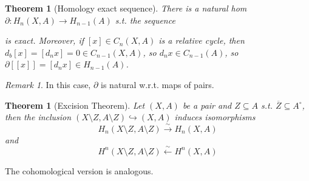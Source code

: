 \documentclass{article}
\theoremstyle{definition}
\theoremstyle{remark}
\newtheorem{rem}{Remark}
\theoremstyle{plain}
\newtheorem{thm}[defn]{Theorem}
\begin{document}
\begin{thm}[Homology exact sequence]
There is a natural hom $\partial:H_n(X,A)\to H_{n-1}(A)$ s.t. the sequence
\begin{center}
\end{center}
is exact. Moreover, if $[x]\in C_n(X,A)$ is a relative cycle, then $d_b[x]=[d_nx]=0\in C_{n-1}(X,A)$, so $d_nx\in C_{n-1}(A)$, so $\partial[[x]]=[d_nx]\in H_{n-1}(A)$.
\end{thm}
\begin{rem}
    In this case, $\partial$ is natural w.r.t. maps of pairs.
\end{rem}
\begin{thm}[Excision Theorem]
Let $(X,A)$ be a pair and $Z\subseteq A$ s.t. $\overline{Z}\subseteq A^\circ$, then the inclusion $(X\setminus Z,A\setminus Z)\hookrightarrow (X,A)$ induces  isomorphisms \[H_n(X\setminus Z,A\setminus Z)\overset{\sim}{\to}H_n(X,A)\]
and
\[H^n(X\setminus Z,A\setminus Z)\overset{\sim}{\leftarrow}H^n(X,A)\]
\end{thm}
The cohomological version is analogous.
\end{document}
